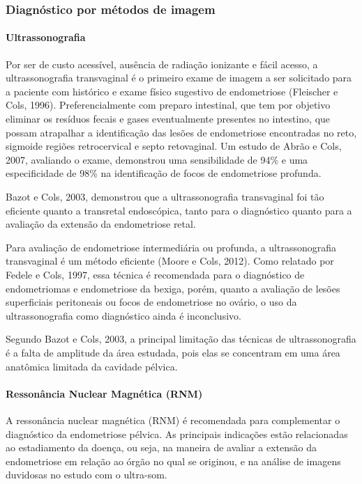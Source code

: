 \documentclass[12pt]{article} %
\begin{document}
\subsubsection{Diagnóstico por métodos de imagem}

\paragraph{Ultrassonografia } 

Por ser de custo acessível, ausência de radiação ionizante e fácil
acesso, a ultrassonografia transvaginal é o primeiro exame de imagem a
ser solicitado para a paciente com histórico e exame físico sugestivo
de endometriose (Fleischer e Cols, 1996). Preferencialmente com
preparo intestinal, que tem por objetivo eliminar os resíduos fecais e
gases eventualmente presentes no intestino, que possam atrapalhar a
identificação das lesões de endometriose encontradas no reto, sigmoide
regiões retrocervical e septo retovaginal. Um estudo de Abrão e
Cols, 2007, avaliando o exame, demonstrou uma sensibilidade de 94\% e
uma especificidade de 98\% na identificação de focos de endometriose
profunda.

Bazot e Cols, 2003, demonstrou que a ultrassonografia transvaginal foi
tão eficiente quanto a transretal endoscópica, tanto para o
diagnóstico quanto para a avaliação da extensão da endometriose retal.

Para avaliação de endometriose intermediária ou profunda, a
ultrassonografia transvaginal é um método eficiente (Moore e Cols,
2012). Como relatado por Fedele e Cols, 1997, essa técnica é
recomendada para o diagnóstico de endometriomas e endometriose da
bexiga, porém, quanto a avaliação de lesões superficiais peritoneais
ou focos de endometriose no ovário, o uso da ultrassonografia como
diagnóstico ainda é inconclusivo.

Segundo Bazot e Cols, 2003, a principal limitação das técnicas de
ultrassonografia é a falta de amplitude da área estudada, pois elas
se concentram em uma área anatômica limitada da cavidade pélvica.

\paragraph{Ressonância Nuclear Magnética (RNM)}

A ressonância nuclear magnética (RNM) é recomendada para complementar
o diagnóstico da endometriose pélvica. As principais indicações estão
relacionadas ao estadiamento da doença, ou seja, na maneira de avaliar
a extensão da endometriose em relação ao órgão no qual se originou, e
na análise de imagens duvidosas no estudo com o ultra-som.
\end{document}
